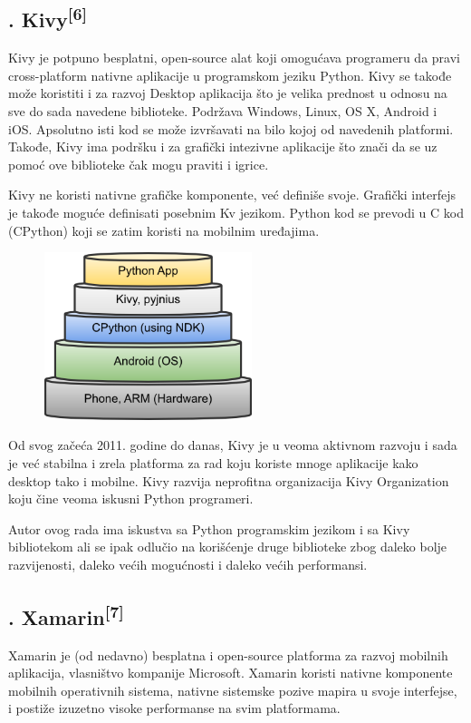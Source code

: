 \documentclass[a4paper]{article}
\begin{document}
\subsection[3.2. Kivy[6{]}]{. Kivy\textsuperscript{[6]}}
\hypertarget{RefHeadingToc1091308303690}{}Kivy je potpuno besplatni,
open-source alat koji omogućava programeru da pravi cross-platform
nativne aplikacije u programskom jeziku Python. Kivy se takođe može
koristiti i za razvoj Desktop aplikacija što je velika prednost u
odnosu na sve do sada navedene biblioteke. Podržava Windows, Linux, OS
X, Android i iOS. Apsolutno isti kod se može izvršavati na bilo kojoj
od navedenih platformi. Takođe, Kivy ima podršku i za grafički
intezivne aplikacije što znači da se uz pomoć ove biblioteke čak mogu
praviti i igrice. 

Kivy ne koristi nativne grafičke komponente, već definiše svoje.
Grafički interfejs je takođe moguće definisati posebnim Kv jezikom.
Python kod se prevodi u C kod (CPython) koji se zatim koristi na
mobilnim uređajima.



\begin{figure}
\centering
\includegraphics[width=60.59mm,height=48.84mm]{msc-img9.png}
\end{figure}
Od svog začeća 2011. godine do danas, Kivy je u veoma aktivnom razvoju i
sada je već stabilna i zrela platforma za rad koju koriste mnoge
aplikacije kako desktop tako i mobilne. Kivy razvija neprofitna
organizacija Kivy Organization koju čine veoma iskusni Python
programeri.

Autor ovog rada ima iskustva sa Python programskim jezikom i sa Kivy
bibliotekom ali se ipak odlučio na korišćenje druge biblioteke zbog
daleko bolje razvijenosti, daleko većih mogućnosti i daleko većih
performansi.

\clearpage\subsection[3.3. Xamarin[7{]}]{.
Xamarin\textsuperscript{[7]}}
\hypertarget{RefHeadingToc1111308303690}{}Xamarin je (od nedavno)
besplatna i open-source platforma za razvoj mobilnih aplikacija,
vlasništvo kompanije Microsoft. Xamarin koristi nativne komponente
mobilnih operativnih sistema, nativne sistemske pozive mapira u svoje
interfejse, i postiže izuzetno visoke performanse na svim platformama.
\end{document}
